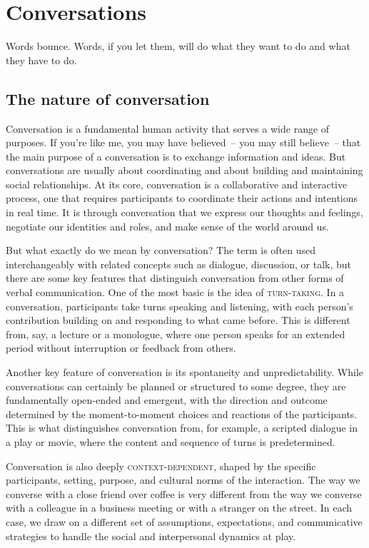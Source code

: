 \chapter{Conversations} \label{ch:conversations}

\epigraph{Words bounce. Words, if you let them, will do what they want to do and what they have to do.}{}

\section{The nature of conversation}

Conversation is a fundamental human activity that serves a wide range of purposes. If you're like me, you may have believed~-- you may still believe~-- that the main purpose of a conversation is to exchange information and ideas. But conversations are usually about coordinating and about building and maintaining social relationships. At its core, conversation is a collaborative and interactive process, one that requires participants to coordinate their actions and intentions in real time. It is through conversation that we express our thoughts and feelings, negotiate our identities and roles, and make sense of the world around us.

But what exactly do we mean by conversation? The term is often used interchangeably with related concepts such as dialogue, discussion, or talk, but there are some key features that distinguish conversation from other forms of verbal communication. One of the most basic is the idea of \textsc{turn-taking}. In a conversation, participants take turns speaking and listening, with each person's contribution building on and responding to what came before. This is different from, say, a lecture or a monologue, where one person speaks for an extended period without interruption or feedback from others.

Another key feature of conversation is its spontaneity and unpredictability. While conversations can certainly be planned or structured to some degree, they are fundamentally open-ended and emergent, with the direction and outcome determined by the moment-to-moment choices and reactions of the participants. This is what distinguishes conversation from, for example, a scripted dialogue in a play or movie, where the content and sequence of turns is predetermined.

Conversation is also deeply \textsc{context-dependent}, shaped by the specific participants, setting, purpose, and cultural norms of the interaction. The way we converse with a close friend over coffee is very different from the way we converse with a colleague in a business meeting or with a stranger on the street. In each case, we draw on a different set of assumptions, expectations, and communicative strategies to handle the social and interpersonal dynamics at play.

